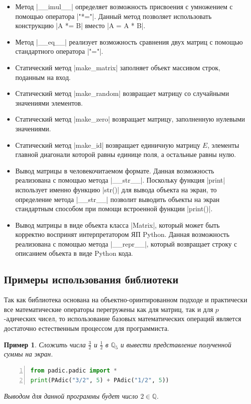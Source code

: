 \documentclass[master, och, times, pract]{sty/SCWorks}
\theoremstyle{plain}
\newtheorem{exmp}{Пример}[section]
\theoremstyle{definition}
\numberwithin{equation}{section}
\begin{document}
\begin{itemize}
\item Метод |__imul__| определяет возможность присвоения с умножением с помощью оператора |"*="|. Данный метод позволяет использовать конструкцию |A *= B| вместо |A = A * B|.
\item Метод |__eq__| реализует возможность сравнения двух матриц с помощью стандартного оператора |"="|.
\item Статический метод |make_matrix| заполняет объект массивом строк, поданным на вход.
\item Статический метод |make_random| возвращает матрицу со случайными значениями элементов.
\item Статический метод |make_zero| возвращает матрицу, заполненную нулевыми значениями.
\item Статический метод |make_id| возвращает единичную матрицу $E$, элементы главной диагонали которой равны единице поля, а остальные равны нулю.
\item Вывод матрицы в человекочитаемом формате. Данная возможность реализована с помощью метода |__str__|. Поскольку функция |print| использует именно функцию |str()| для вывода объекта на экран, то определение метода |__str__| позволит выводить объекты на экран стандартным способом при помощи встроенной функции |print()|.
\item Вывод матрицы в виде объекта класса |Matrix|, который может быть корректно воспринят интерпретатором ЯП Python. Данная возможность реализована с помощью метода |__repr__|, который возвращает строку с описанием объекта в виде Python кода.
\end{itemize}


\subsection{Примеры использования библиотеки}

Так как библиотека основана на объектно-оринтированном подходе и практически все математические операторы перегружены как для матриц, так и для $p$-адических чисел, то использование базовых математических операций является достаточно естественным процессом для программиста.

\begin{exmp}
Сложить числа $\frac{3}{2}$ и $\frac{1}{2}$ в $\mathbb{Q}_5$ и вывести представление полученной суммы на экран.
\begin{lstlisting}[language=Python, numbers=left, showstringspaces=false, breaklines=true, basicstyle=\small]
from padic.padic import *
print(PAdic("3/2", 5) + PAdic("1/2", 5))
\end{lstlisting}

\noindent Выводом для данной программы будет число $2 \in \mathbb{Q}$.
\end{exmp}
\end{document}
